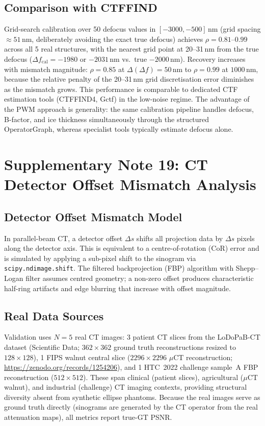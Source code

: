 \documentclass[11pt]{article}
\theoremstyle{definition}
\begin{document}
\subsection{Comparison with CTFFIND}
Grid-search calibration over 50 defocus values in $[-3000, -500]$\,nm (grid spacing ${\approx}51$\,nm, deliberately avoiding the exact true defocus) achieves $\rho = 0.81$--$0.99$ across all 5 real structures, with the nearest grid point at 20--31\,nm from the true defocus ($\Delta f_{\mathrm{cal}} = -1980$ or $-2031$\,nm vs.\ true $-2000$\,nm).
Recovery increases with mismatch magnitude: $\rho = 0.85$ at $\Delta(\Delta f){=}50$\,nm to $\rho = 0.99$ at $1000$\,nm, because the relative penalty of the 20--31\,nm grid discretisation error diminishes as the mismatch grows.
This performance is comparable to dedicated CTF estimation tools (CTFFIND4, Gctf) in the low-noise regime.
The advantage of the PWM approach is generality: the same calibration pipeline handles defocus, B-factor, and ice thickness simultaneously through the structured OperatorGraph, whereas specialist tools typically estimate defocus alone.


\section{Supplementary Note 19: CT Detector Offset Mismatch Analysis}
\label{sec:note_cbct}

\subsection{Detector Offset Mismatch Model}
In parallel-beam CT, a detector offset $\Delta s$ shifts all projection data by $\Delta s$ pixels along the detector axis. This is equivalent to a centre-of-rotation (CoR) error and is simulated by applying a sub-pixel shift to the sinogram via \texttt{scipy.ndimage.shift}. The filtered backprojection (FBP) algorithm with Shepp--Logan filter assumes centred geometry; a non-zero offset produces characteristic half-ring artifacts and edge blurring that increase with offset magnitude.

\subsection{Real Data Sources}
Validation uses $N{=}5$ real CT images: 3 patient CT slices from the LoDoPaB-CT dataset (Scientific Data; $362 \times 362$ ground truth reconstructions resized to $128 \times 128$), 1 FIPS walnut central slice ($2296 \times 2296$ $\mu$CT reconstruction; \url{https://zenodo.org/records/1254206}), and 1 HTC~2022 challenge sample~A FBP reconstruction ($512 \times 512$). These span clinical (patient slices), agricultural ($\mu$CT walnut), and industrial (challenge) CT imaging contexts, providing structural diversity absent from synthetic ellipse phantoms. Because the real images serve as ground truth directly (sinograms are generated by the CT operator from the real attenuation maps), all metrics report true-GT PSNR.
\end{document}
